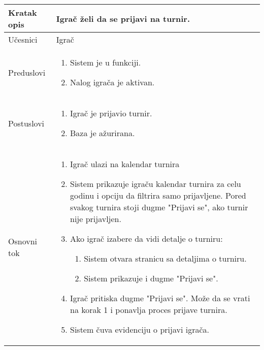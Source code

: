 \documentclass{article}
\begin{document}
        \begin{longtable}{| p{} | p{} |} 
            \hline
                Kratak opis & Igrač želi da se prijavi na turnir.\\ 
            \hline    
                Učesnici & Igrač \\
            \hline
               Preduslovi & \begin{enumerate}
                   \item Sistem je u funkciji.
                   \item Nalog igrača je aktivan.
               \end{enumerate}\\
            \hline  
                Postuslovi & \begin{enumerate}
                    \item Igrač je prijavio turnir.
                    \item Baza je ažurirana.
                \end{enumerate}\\
            \hline
                Osnovni tok & \begin{enumerate}
                    \item Igrač ulazi na kalendar turnira
                    \item Sistem prikazuje igraču kalendar turnira za celu godinu i opciju da filtrira samo prijavljene. Pored svakog turnira stoji dugme "Prijavi se", ako turnir nije prijavljen.
                    \item Ako igrač izabere da vidi detalje o turniru:
                    \begin{enumerate}
                        \item Sistem otvara stranicu sa detaljima o turniru.
                        \item Sistem prikazuje i dugme "Prijavi se".
                    \end{enumerate}
                    \item Igrač pritiska dugme "Prijavi se". Može da se vrati na korak 1 i ponavlja proces prijave turnira.
                    \item Sistem čuva evidenciju o prijavi igrača.
                    

\end{enumerate}
\end{longtable}
\end{document}
